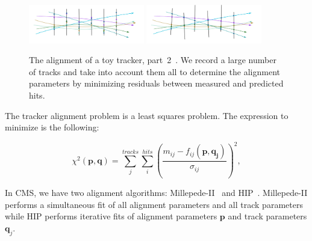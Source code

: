 \begin{figure}[htb]
    \begin{center}
        \includegraphics[width=0.45\textwidth]{../figs/Alignment/toyTracker12.png}
        \includegraphics[width=0.45\textwidth]{../figs/Alignment/toyTracker13.png}
    \end{center}
    \caption{The alignment of a toy tracker, part~2~\cite{ref_Frank_presentation}. We record a large number of tracks and take into account them all to determine the alignment parameters by minimizing residuals between measured and predicted hits.}
    \label{fig:toyTracker_part2}
\end{figure}


The tracker alignment problem is a least squares problem. The expression to minimize is the following:

\begin{equation}
  \chi^2(\mathbf{p},\mathbf{q})=\sum_j^{tracks} \sum_i^{hits} \left( {\frac{m_{ij}-f_{ij}(\mathbf{p},\mathbf{q_j})}{\sigma_{ij}}} \right)^2,
\end{equation}


In CMS, we have two alignment algorithms: Millepede-II~\cite{ref_MPII_Alg} and HIP~\cite{ref_HIP_Alg}. Millepede-II performs a simultaneous fit of all alignment parameters and all track parameters while HIP performs iterative fits of alignment parameters $\mathbf{p}$ and track parameters $\mathbf{q}_j$.

